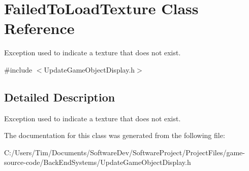 \hypertarget{class_failed_to_load_texture}{}\section{Failed\+To\+Load\+Texture Class Reference}
\label{class_failed_to_load_texture}


Exception used to indicate a texture that does not exist.  




{\ttfamily \#include $<$Update\+Game\+Object\+Display.\+h$>$}



\subsection{Detailed Description}
Exception used to indicate a texture that does not exist. 

The documentation for this class was generated from the following file\+:\begin{DoxyCompactItemize}
\item 
C\+:/\+Users/\+Tim/\+Documents/\+Software\+Dev/\+Software\+Project/\+Project\+Files/game-\/source-\/code/\+Back\+End\+Systems/Update\+Game\+Object\+Display.\+h\end{DoxyCompactItemize}
